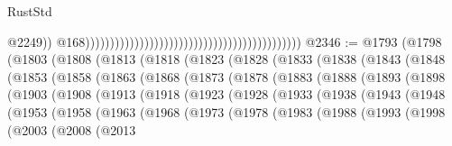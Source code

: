 \begin{lexlean}{RustStd}
\begin{coremodule}
{\begin{coremodule}
{{{{{{{{{{{{{{{{{{{{{{{{{{{{{{{{{{{{{{{{{{{{{{{{{{{{{{{{{{{{                                                                                                @2249))
                                                                                            @168))))))))))))))))))))))))))))))))))))))))))))
@2346 := @1793
    (@1798
      (@1803
        (@1808
          (@1813
            (@1818
              (@1823
                (@1828
                  (@1833
                    (@1838
                      (@1843
                        (@1848
                          (@1853
                            (@1858
                              (@1863
                                (@1868
                                  (@1873
                                    (@1878
                                      (@1883
                                        (@1888
                                          (@1893
                                            (@1898
                                              (@1903
                                                (@1908
                                                  (@1913
                                                    (@1918
                                                      (@1923
                                                        (@1928
                                                          (@1933
                                                            (@1938
                                                              (@1943
                                                                (@1948
                                                                  (@1953
                                                                    (@1958
                                                                      (@1963
                                                                        (@1968
                                                                          (@1973
                                                                            (@1978
                                                                              (@1983
                                                                                (@1988
                                                                                  (@1993
                                                                                    (@1998
                                                                                      (@2003
                                                                                        (@2008
                                                                                          (@2013
}}}}}}}}}}}}}}}}}}}}}}}}}}}}}}}}}}}}}}}}}}}}}}}}}}}}}}}}}}}}
\end{coremodule}}
\end{coremodule}
\end{lexlean}
